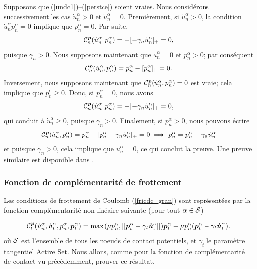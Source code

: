 \begin{pruf}
Supposons que (\ref{undc1})--(\ref{perstce}) soient vraies. Nous considérons successivement les cas $\dot{u}^{\alpha}_n > 0$  et $\dot{u}^{\alpha}_n = 0$. Premièrement, si $\dot{u}^{\alpha}_n > 0$, la condition $\dot{u}^{\alpha}_n p^{\alpha}_n = 0$ implique que $p^{\alpha}_n = 0$. Par suite,
\begin{equation*}
{\cal C}_{n}^{\boldsymbol{p}}(\dot{u}^{\alpha}_n,p^{\alpha}_n)=-[- \gamma_n \dot{u}^{\alpha}_n]_+=0,
\end{equation*}
\noindent puisque $\gamma_n>0$.  Nous supposons maintenant que $\dot{u}^{\alpha}_n = 0$ et $p^{\alpha}_n > 0$; par conséquent
\begin{equation*}
{\cal C}_{n}^{\boldsymbol{p}}(\dot{u}^{\alpha}_n,p^{\alpha}_n)=p^{\alpha}_n -[p^{\alpha}_n]_+=0.
\end{equation*}
\noindent Inversement, nous supposons maintenant que ${\cal C}_{n}^{\boldsymbol{p}}(\dot{u}^{\alpha}_n,p^{\alpha}_n)=0$ est vraie; cela implique que $p^{\alpha}_n \geq 0$. Donc, si $p^{\alpha}_n = 0$, nous avons
\begin{equation*}
{\cal C}_{n}^{\boldsymbol{p}}(\dot{u}^{\alpha}_n,p^{\alpha}_n)=-[- \gamma_n \dot{u}^{\alpha}_n]_+=0,
\end{equation*}
\noindent qui conduit à $\dot{u}^{\alpha}_n \geq 0$, puisque $\gamma_n>0$. Finalement, si $p^{\alpha}_n > 0$, nous pouvons écrire
\begin{equation*}
{\cal C}_{n}^{\boldsymbol{p}}(\dot{u}^{\alpha}_n,p^{\alpha}_n)=p^{\alpha}_n - [p^{\alpha}_n - \gamma_n \dot{u}^{\alpha}_n]_+=0 \implies p^{\alpha}_n = p^{\alpha}_n - \gamma_n \dot{u}^{\alpha}_n
\end{equation*}
\noindent et puisque $\gamma_n > 0$, cela implique que $\dot{u}^{\alpha}_n = 0$, ce qui conclut la preuve. Une preuve similaire est disponible dans \cite{barboteu2018primal}.
\end{pruf}

\subsubsection{Fonction de complémentarité de frottement}\label{comp_fric}
\noindent Les conditions de frottement de Coulomb (\ref{fricdc_gran}) sont représentées par la fonction complémentarité non-linéaire suivante (pour tout $\alpha \in {\cal S}$)

\begin{align}
{\cal C}_{t}^{\boldsymbol{p}}(\dot{u}^{\alpha}_n,\boldsymbol{\dot{u}}^{\alpha}_t,p^{\alpha}_n,\boldsymbol{p}^{\alpha}_t)=\max{(\mu p^{\alpha}_n, ||\boldsymbol{p}^{\alpha}_t - \gamma_t \boldsymbol{\dot{u}}^{\alpha}_t||)}\boldsymbol{p}^{\alpha}_t - \mu p^{\alpha}_n(\boldsymbol{p}^{\alpha}_t - \gamma_t \boldsymbol{\dot{u}}^{\alpha}_t).\label{complementary_t}
\end{align}
\noindent où ${\cal S}$ est l'ensemble de tous les noeuds de contact potentiels, et $ \gamma_t $ le paramètre tangentiel Active Set. Nous allons, comme pour la fonction de complémentarité de contact vu précédemment, prouver ce résultat.

